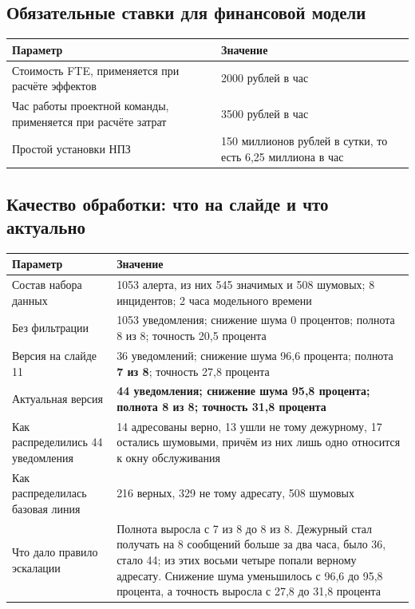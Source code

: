 \documentclass[11pt]{article}
\begin{document}
\subsection{Обязательные ставки для финансовой модели}
\begin{longtable}{|L{9cm}|L{7.5cm}|}
\hline
\textbf{Параметр} & \textbf{Значение} \\ \hline
Стоимость FTE, применяется при расчёте эффектов & 2000 рублей в час \\ \hline
Час работы проектной команды, применяется при расчёте затрат & 3500 рублей в час \\ \hline
Простой установки НПЗ & 150 миллионов рублей в сутки, то есть 6,25 миллиона в час \\ \hline
\end{longtable}

\subsection{Качество обработки: что на слайде и что актуально}
\begin{longtable}{|L{7cm}|L{9.5cm}|}
\hline
\textbf{Параметр} & \textbf{Значение} \\ \hline
Состав набора данных & 1053 алерта, из них 545 значимых и 508 шумовых; 8 инцидентов; 2 часа модельного времени \\ \hline
Без фильтрации & 1053 уведомления; снижение шума 0 процентов; полнота 8 из 8; точность 20,5 процента \\ \hline
Версия на слайде 11 & 36 уведомлений; снижение шума 96,6 процента; полнота \textbf{7 из 8}; точность 27,8 процента \\ \hline
Актуальная версия & \textbf{44 уведомления; снижение шума 95,8 процента; полнота 8 из 8; точность 31,8 процента} \\ \hline
Как распределились 44 уведомления & 14 адресованы верно, 13 ушли не тому дежурному, 17 остались шумовыми, причём из них лишь одно относится к окну обслуживания \\ \hline
Как распределилась базовая линия & 216 верных, 329 не тому адресату, 508 шумовых \\ \hline
Что дало правило эскалации & Полнота выросла с 7 из 8 до 8 из 8. Дежурный стал получать на 8 сообщений больше за два часа, было 36, стало 44; из этих восьми четыре попали верному адресату. Снижение шума уменьшилось с 96,6 до 95,8 процента, а точность выросла с 27,8 до 31,8 процента \\ \hline
\end{longtable}
\end{document}
